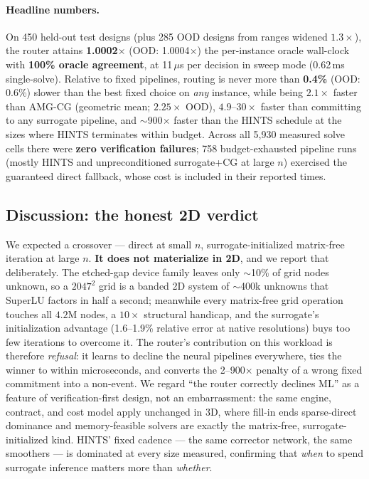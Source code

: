 \documentclass[11pt]{article}
\begin{document}
\paragraph{Headline numbers.} On 450 held-out test designs (plus 285 OOD
designs from ranges widened $1.3\times$), the router attains
\textbf{1.0002$\times$} (OOD: 1.0004$\times$) the per-instance oracle
wall-clock with \textbf{100\% oracle agreement}, at 11\,$\mu$s per decision in
sweep mode (0.62\,ms single-solve). Relative to fixed pipelines, routing is
never more than \textbf{0.4\%} (OOD: 0.6\%) slower than the best fixed choice
on \emph{any} instance, while being $2.1\times$ faster than AMG-CG
(geometric mean; $2.25\times$ OOD), $4.9$--$30\times$ faster than committing
to any surrogate pipeline, and $\sim$900$\times$ faster than the HINTS
schedule at the sizes where HINTS terminates within budget. Across all 5{,}930
measured solve cells there were \textbf{zero verification failures}; 758
budget-exhausted pipeline runs (mostly HINTS and unpreconditioned
surrogate+CG at large $n$) exercised the guaranteed direct fallback, whose
cost is included in their reported times.

\subsection{Discussion: the honest 2D verdict}
We expected a crossover --- direct at small $n$, surrogate-initialized
matrix-free iteration at large $n$. \textbf{It does not materialize in 2D},
and we report that deliberately. The etched-gap device family leaves only
$\sim$10\% of grid nodes unknown, so a $2047^2$ grid is a banded 2D system of
$\sim$400k unknowns that SuperLU factors in half a second; meanwhile every
matrix-free grid operation touches all $4.2$M nodes, a $10\times$ structural
handicap, and the surrogate's initialization advantage (1.6--1.9\% relative
error at native resolutions) buys too few iterations to overcome it. The
router's contribution on this workload is therefore \emph{refusal}: it learns
to decline the neural pipelines everywhere, ties the winner to within
microseconds, and converts the 2--900$\times$ penalty of a wrong fixed
commitment into a non-event. We regard ``the router correctly declines ML''
as a feature of verification-first design, not an embarrassment: the same
engine, contract, and cost model apply unchanged in 3D, where fill-in ends
sparse-direct dominance and memory-feasible solvers are exactly the
matrix-free, surrogate-initialized kind. HINTS' fixed cadence --- the same
corrector network, the same smoothers --- is dominated at every size
measured, confirming that \emph{when} to spend surrogate inference matters
more than \emph{whether}.
\end{document}
